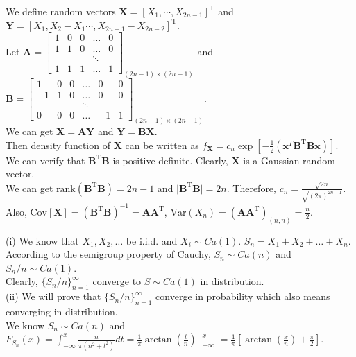 \documentclass{homework}
\begin{document}
\question %
We define random vectors $\mathbf{X}=[X_1,\cdots, X_{2n-1}]^\mathrm{T}$ and $\mathbf{Y}=[X_1,X_2-X_1 \cdots, X_{2n-1}-X_{2n-2}]^\mathrm{T}$.\\
Let $\mathbf{A}=\left[\begin{array}{cccccc}
    1 & 0 & 0 & \ldots & 0  \\
    1 & 1 & 0 & \ldots & 0 \\
      &   &   & \ddots &   \\
    1 & 1 & 1 & \ldots & 1 
    \end{array}\right]_{(2n-1)\times (2n-1)}$ 
and $\mathbf{B}=\left[\begin{array}{cccccc}
    1 & 0 & 0 & \ldots & 0 & 0 \\
    -1 & 1 & 0 & \ldots & 0 & 0 \\
     &  &  & \ddots &  &  \\
    0 & 0 & 0 & \ldots & -1 & 1
    \end{array}\right]_{(2n-1)\times (2n-1)}$. \\
We can get $\mathbf{X}=\mathbf{A}\mathbf{Y}$ and $\mathbf{Y}=\mathbf{B}\mathbf{X}$.\\
Then density function of $\mathbf{X}$ can be written as $f_{\mathbf{X}}= c_{n} \exp \left[-\frac{1}{2}\left(\mathbf{x}^{T} \mathbf{B^\mathrm{T}}\mathbf{B} \mathbf{x}\right)\right]$.\\
We can verify that $\mathbf{B^\mathrm{T}}\mathbf{B}$ is positive definite. Clearly, $\mathbf{X}$ is a Gaussian random vector.\\
We can get $\text{rank}(\mathbf{B^\mathrm{T}}\mathbf{B})=2n-1$ and $\mid \mathbf{B^\mathrm{T}}\mathbf{B}\mid = 2n$. Therefore, $c_n = \frac{\sqrt{2n}}{\sqrt{(2\pi)^{2n-1}}}$.\\

Also, $\text{Cov}[\mathbf{X}] = (\mathbf{B}^\mathrm{T} \mathbf{B})^{-1} = \mathbf{A} \mathbf{A}^\mathrm{T}$, $\text{Var}(X_n)=(\mathbf{A} \mathbf{A}^\mathrm{T})_{(n,n)} = \frac{n}{2}$.

\question%
(i) We know that $X_1, X_2, \ldots $ be i.i.d. and $X_i \sim Ca(1)$. $S_n = X_1+X_2+\ldots+X_n$.\\
According to the semigroup property of Cauchy, $S_n \sim Ca(n)$ and $S_n/n \sim Ca(1)$.\\
Clearly, $\{S_n/n\}_{n=1}^{\infty}$ converge to $S \sim Ca(1)$ in distribution.\\

(ii) We will prove that $\{S_n/n\}_{n=1}^{\infty}$ converge in probability which also means converging in distribution.\\
We know $S_n \sim Ca(n)$ and $F_{S_n}(x) = \int_{-\infty}^{x}\frac{n}{\pi(n^2+t^2)}dt 
= \frac{1}{\pi}\arctan(\frac{t}{n})\mid^x_{-\infty} = \frac{1}{\pi}[\arctan(\frac{x}{n})+\frac{\pi}{2}]$.
\end{document}
